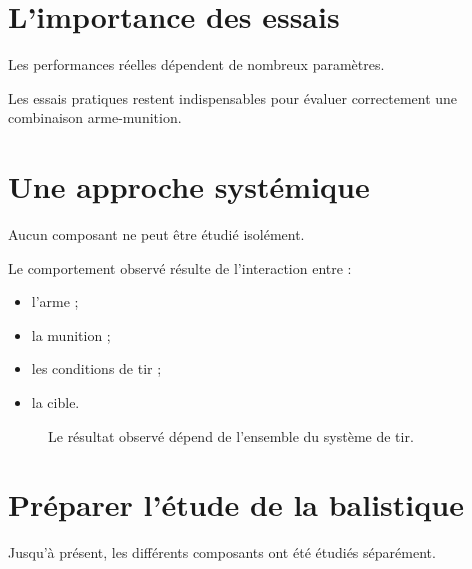 \section{L'importance des essais}

Les performances réelles dépendent de nombreux paramètres.

Les essais pratiques restent indispensables pour évaluer correctement une
combinaison arme-munition.

\section{Une approche systémique}

Aucun composant ne peut être étudié isolément.

Le comportement observé résulte de l'interaction entre :

\begin{itemize}
    \item l'arme ;
    \item la munition ;
    \item les conditions de tir ;
    \item la cible.
\end{itemize}

\begin{figure}[htbp]
\centering


\caption{Le résultat observé dépend de l'ensemble du système de tir.}
\label{fig:systeme_tir}

\end{figure}

\section{Préparer l'étude de la balistique}

Jusqu'à présent, les différents composants ont été étudiés séparément.

